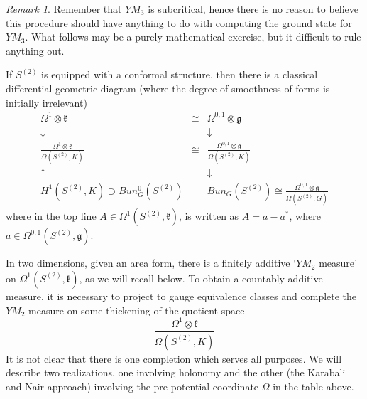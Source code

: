 \documentclass{amsart}
\theoremstyle{conjecture}
\theoremstyle{definition}
\theoremstyle{question}
\theoremstyle{questions}
\theoremstyle{remark}
\newtheorem*{remark}{Remark}
\theoremstyle{remarks}
\theoremstyle{example}
\numberwithin{equation}{section}
\begin{document}
\begin{remark} Remember that $YM_3$ is subcritical, hence there is no reason to believe this procedure should have anything to do with computing the ground state for $YM_3$.
What follows may be a purely mathematical exercise, but it difficult to rule anything out.
\end{remark}

If $S^{(2)}$ is equipped with a conformal structure, then there is a classical differential geometric diagram 
(where the degree of smoothness of forms is initially irrelevant)
\begin{equation}\label{diagram1}\begin{matrix}  \Omega^1\otimes \mathfrak k &\cong & \Omega^{0,1}\otimes \mathfrak g\\
\downarrow & &\downarrow\\
\frac{\Omega^1\otimes \mathfrak k}{\Omega(S^{(2)},K)} & \cong&  \frac{\Omega^{0,1}\otimes \mathfrak g}{\Omega(S^{(2)},K)} \\  \uparrow & &\downarrow\\ 
 H^1(S^{(2)},K)\supset Bun_G^0(S^{(2)}) & & Bun_G(S^{(2)})\cong \frac{\Omega^{0,1}\otimes \mathfrak g}{\Omega(S^{(2)},G)} \end{matrix} \end{equation}
where in the top line $A\in \Omega^1(S^{(2)},\mathfrak k)$, is written as $A=a-a^*$, where $a\in \Omega^{0,1}(S^{(2)},\mathfrak g)$.

In two dimensions, given an area form, there is a finitely additive `$YM_2$ measure' on $\Omega^1(S^{(2)},\mathfrak k)$, as we will recall below. To obtain a countably additive measure, it is necessary to project to gauge equivalence classes and complete the $YM_2$ measure on some thickening of the quotient space 
$$\frac{\Omega^1\otimes \mathfrak k}{\Omega(S^{(2)},K)} $$
It is not clear that there is one completion which serves all purposes. We will describe two realizations, one 
involving holonomy and the other (the Karabali and Nair approach) involving the pre-potential coordinate $\Omega$ in the table above. 
\end{document}
